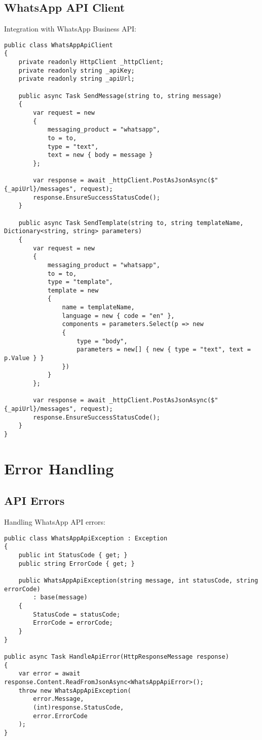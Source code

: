 \subsection{WhatsApp API Client}
Integration with WhatsApp Business API:

\begin{lstlisting}[language=CSharp]
public class WhatsAppApiClient
{
    private readonly HttpClient _httpClient;
    private readonly string _apiKey;
    private readonly string _apiUrl;

    public async Task SendMessage(string to, string message)
    {
        var request = new
        {
            messaging_product = "whatsapp",
            to = to,
            type = "text",
            text = new { body = message }
        };

        var response = await _httpClient.PostAsJsonAsync($"{_apiUrl}/messages", request);
        response.EnsureSuccessStatusCode();
    }

    public async Task SendTemplate(string to, string templateName, Dictionary<string, string> parameters)
    {
        var request = new
        {
            messaging_product = "whatsapp",
            to = to,
            type = "template",
            template = new
            {
                name = templateName,
                language = new { code = "en" },
                components = parameters.Select(p => new
                {
                    type = "body",
                    parameters = new[] { new { type = "text", text = p.Value } }
                })
            }
        };

        var response = await _httpClient.PostAsJsonAsync($"{_apiUrl}/messages", request);
        response.EnsureSuccessStatusCode();
    }
}
\end{lstlisting}

\section{Error Handling}

\subsection{API Errors}
Handling WhatsApp API errors:

\begin{lstlisting}[language=CSharp]
public class WhatsAppApiException : Exception
{
    public int StatusCode { get; }
    public string ErrorCode { get; }

    public WhatsAppApiException(string message, int statusCode, string errorCode)
        : base(message)
    {
        StatusCode = statusCode;
        ErrorCode = errorCode;
    }
}

public async Task HandleApiError(HttpResponseMessage response)
{
    var error = await response.Content.ReadFromJsonAsync<WhatsAppApiError>();
    throw new WhatsAppApiException(
        error.Message,
        (int)response.StatusCode,
        error.ErrorCode
    );
}
\end{lstlisting}

